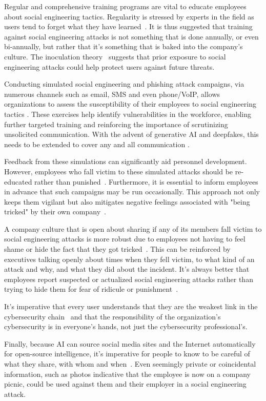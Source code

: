 Regular and comprehensive training programs are vital to educate employees about social engineering tactics. Regularity is stressed by experts in the field as users tend to forget what they have learned~\citep{hadnagy_Social_Engineering_The_Science_2018, mitnick_The_Art_of_Deception_2003}. It is thus suggested that training against social engineering attacks is not something that is done annually, or even bi-annually, but rather that it's something that is baked into the company's culture. The inoculation theory~\citep{blauth_AI_Crime_Overview_Malicious_Use_Abuse_2022} suggests that prior exposure to social engineering attacks could help protect users against future threats.

Conducting simulated social engineering and phishing attack campaigns, via numerous channels such as email, SMS and even phone/VoIP, allows organizations to assess the susceptibility of their employees to social engineering tactics \citep{hadnagy_Social_Engineering_The_Science_2018}. These exercises help identify vulnerabilities in the workforce, enabling further targeted training and reinforcing the importance of scrutinizing unsolicited communication. With the advent of generative AI and deepfakes, this needs to be extended to cover any and all communication \citep{mirsky_Creation_Detection_Deepfakes_2021}.

Feedback from these simulations can significantly aid personnel development. However, employees who fall victim to these simulated attacks should be re-educated rather than punished~\citep{mitnick_The_Art_of_Deception_2003}. Furthermore, it is essential to inform employees in advance that such campaigns may be run occasionally. This approach not only keeps them vigilant but also mitigates negative feelings associated with "being tricked" by their own company~\citep{hadnagy_Social_Engineering_The_Science_2018}.

A company culture that is open about sharing if any of its members fall victim to social engineering attacks is more robust due to employees not having to feel shame or hide the fact that they got tricked~\citep{hadnagy_Social_Engineering_The_Science_2018}. This can be reinforced by executives talking openly about times when they fell victim, to what kind of an attack and why, and what they did about the incident. It's always better that employees report suspected or actualized social engineering attacks rather than trying to hide them for fear of ridicule or punishment~\citep{mitnick_The_Art_of_Deception_2003}.

It's imperative that every user understands that they are the weakest link in the cybersecurity chain~\citep{mitnick_The_Art_of_Deception_2003} and that the responsibility of the organization's cybersecurity is in everyone's hands, not just the cybersecurity professional's.

Finally, because AI can source social media sites and the Internet automatically for open-source intelligence, it's imperative for people to know to be careful of what they share, with whom and when~\citep{mitnick_The_Art_of_Deception_2003}. Even seemingly private or coincidental information, such as photos indicative that the employee is now on a company picnic, could be used against them and their employer in a social engineering attack.